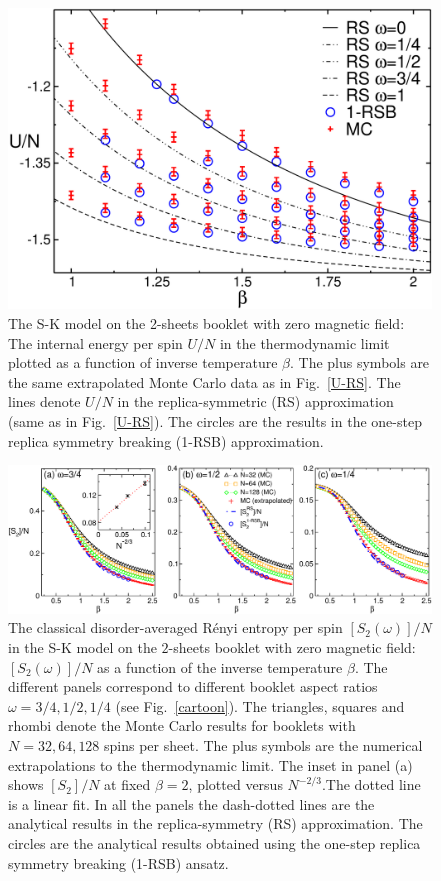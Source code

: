 \documentclass[twocolumn,superscriptaddress,prb,10pt]{revtex4-1}
\begin{document}
\begin{figure}[t]
\includegraphics*[width=0.93\linewidth]{./draft_figs/U_extrapolated_v1}
\caption{
 The S-K model on the 2-sheets booklet with zero magnetic field: 
 The internal energy per spin $U/N$ in the thermodynamic limit plotted 
 as a function of inverse temperature $\beta$. The plus symbols are the same 
 extrapolated Monte Carlo data as in Fig.~\ref{U-RS}. The lines denote $U/N$ 
 in the replica-symmetric (RS) approximation (same as in Fig.~\ref{U-RS}). 
 The circles are the results  in the one-step replica symmetry breaking 
 (1-RSB) approximation.
}
\label{U-RSB-1}
\end{figure}


\begin{figure}[t]
\includegraphics*[width=0.93\linewidth]{./draft_figs/Renyi_MC_v2}
\caption{ The classical disorder-averaged R\'enyi entropy per spin $[S_2(\omega)]/N$  
 in the S-K model on the $2$-sheets booklet with zero magnetic field: 
 $[S_2(\omega)]/N$ as a function of the inverse temperature $\beta$. The different panels 
 correspond to different booklet aspect ratios $\omega=3/4,1/2,1/4$ (see Fig.~\ref{cartoon}). 
 The triangles, squares and rhombi denote the Monte Carlo results for 
 booklets with $N=32,64,128$ spins per sheet. The plus symbols are the numerical 
 extrapolations to the thermodynamic limit. The inset in panel (a) shows 
 $[S_2]/N$ at fixed $\beta=2$, plotted versus $N^{-2/3}$.The dotted line is 
 a linear fit. In all the panels  the dash-dotted lines are the  
 analytical results in the replica-symmetry (RS) approximation. 
 The circles are the analytical results obtained 
 using the one-step replica symmetry breaking (1-RSB) ansatz.
}
\label{Renyi-MC}
\end{figure}
\end{document}
